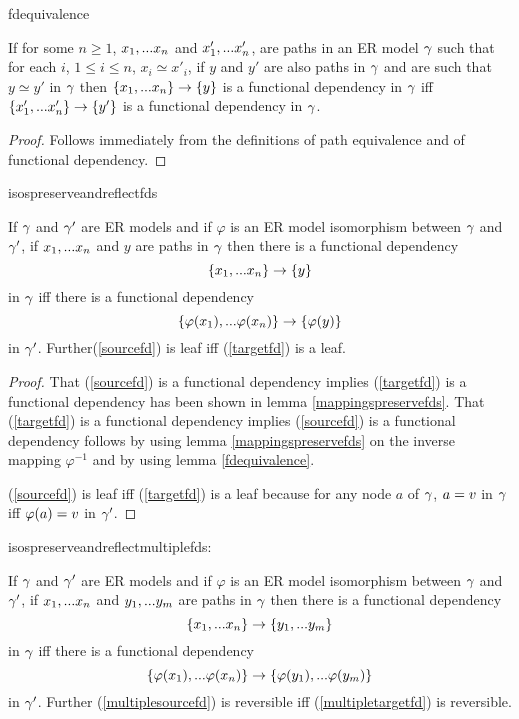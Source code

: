 fdequivalence
\begin{lemma}
\label{fdequivalence}
If for some $n \geq 1$, $x_1,...x_n$ and $x'_1,...x'_n$,  are paths in an ER model $\gamma$
such that for each $i$, $1 \leq i \leq n$, $x_i \simeq x'_i$,
if $y$ and $y'$ are also paths in $\gamma$ and are 
such that $y \simeq y'$ in $\gamma$ then $\left\{x_1,...x_n\right\} \rightarrow \left\{y\right\}$ is a functional dependency in $\gamma$ iff 
$\left\{x'_1,...x'_n\right\} \rightarrow \left\{y'\right\}$ is a functional dependency in $\gamma$.
\end{lemma}
\begin{proof}
Follows immediately from the definitions of path equivalence and of functional dependency.
\end{proof}
isospreserveandreflectfds
\begin{lemma}
\label{isospreserveandreflectfds}
If $\gamma$ and $\gamma'$ are ER models and  if  $\varphi$ is an ER model isomorphism between $\gamma$  and $\gamma'$,  if $x_1,...x_n$ and $y$ are paths in $\gamma$
then there is a  functional dependency
\begin{equation}
\label{sourcefd}
\left\{x_1,...x_n\right\} \rightarrow \left\{y\right\}
\end{equation} 
in $\gamma$ iff there is a functional dependency
\begin{equation}
\label{targetfd}
\left\{\varphi(x_1),...\varphi(x_n)\right\} \rightarrow \left\{\varphi(y)\right\}
\end{equation}
in $\gamma'$.
Further(\ref{sourcefd}) is  leaf  iff (\ref{targetfd}) is a leaf.

\end{lemma}
\begin{proof}
\vspace{0.5cm}
That (\ref{sourcefd}) is a functional dependency implies
(\ref{targetfd}) is a functional dependency has been shown in lemma \ref{mappingspreservefds}. That (\ref{targetfd}) is a functional dependency implies
(\ref{sourcefd}) is a functional dependency follows by using lemma 
 \ref{mappingspreservefds}
on the inverse mapping $\varphi^{-1}$ and by using lemma  \ref{fdequivalence}.

(\ref{sourcefd}) is  leaf  iff (\ref{targetfd}) is a leaf 
because for any node $a$ of $\gamma$, $a= v$ in $\gamma$ iff $\varphi(a)=v$ in $\gamma'$.
\end{proof}

isospreserveandreflectmultiplefds:
\begin{corollary}
\label{isospreserveandreflectmultiplefds}
If $\gamma$ and $\gamma'$ are ER models and  if  $\varphi$ is an ER model isomorphism between $\gamma$  and $\gamma'$,  if $x_1,...x_n$ and $y_1,...y_m$ are paths 
in $\gamma$
then there is a  functional dependency
\begin{equation}
\label{multiplesourcefd}
\left\{x_1,...x_n\right\} \rightarrow \left\{y_1,...y_m\right\}
\end{equation} 
in $\gamma$ iff there is a functional dependency
\begin{equation}
\label{multipletargetfd}
\left\{\varphi(x_1),...\varphi(x_n)\right\} \rightarrow \left\{\varphi(y_1),...\varphi(y_m)\right\}
\end{equation}
in $\gamma'$.
Further (\ref{multiplesourcefd}) is reversible iff (\ref{multipletargetfd}) is reversible.
\end{corollary}

